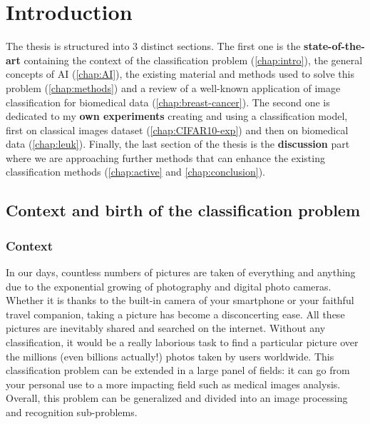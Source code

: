 \documentclass[11pt, openany]{report}
\theoremstyle{plain}
\theoremstyle{definition}
\theoremstyle{remark}
\begin{document}
\tableofcontents


\chapter{Introduction} \label{chap:intro}
The thesis is structured into 3 distinct sections. The first one is the \textbf{state-of-the-art} containing the context of the classification problem (\autoref{chap:intro}), the general concepts of AI (\autoref{chap:AI}), the existing material and methods used to solve this problem (\autoref{chap:methods}) and a review of a well-known application of image classification for biomedical data (\autoref{chap:breast-cancer}). The second one is dedicated to my \textbf{own experiments} creating and using a classification model, first on classical images dataset (\autoref{chap:CIFAR10-exp}) and then on biomedical data (\autoref{chap:leuk}). Finally, the last section of the thesis is the \textbf{discussion} part where we are approaching further methods that can enhance the existing classification methods (\autoref{chap:active} and \autoref{chap:conclusion}).

\section{Context and birth of the classification problem}

\subsection{Context}

In our days, countless numbers of pictures are taken of everything and anything due to the exponential growing of photography and digital photo cameras. Whether it is thanks to the built-in camera of your smartphone or your faithful travel companion, taking a picture has become a disconcerting ease. All these pictures are inevitably shared and searched on the internet. Without any classification, it would be a really laborious task to find a particular picture over the millions (even billions actually!) photos taken by users worldwide. This classification problem can be extended in a large panel of fields: it can go from your personal use to a more impacting field such as medical images analysis. Overall, this problem can be generalized and divided into an image processing and recognition sub-problems.  \\
\end{document}
